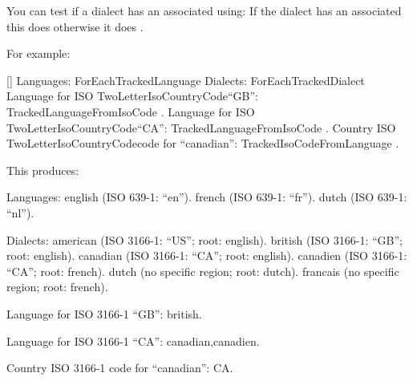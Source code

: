 \documentclass[titlepage=false,oneside,
 fontsize=12pt,captions=tableheading]{scrbook}
\begin{document}
You can test if a dialect has an associated  using:
If the dialect has an associated  this does 
otherwise it does .

For example:
\begin{codebox}
[\dcomma{}\dcomma{}\dcomma{}\dcomma{}\dcomma{}]
\codepar
{}
\codepar
{}
Languages:
\gls{ForEachTrackedLanguage}
\codepar
Dialects:
\gls{ForEachTrackedDialect}
\codepar
Language for ISO \gls{TwoLetterIsoCountryCode}\cmd{ }``GB'':
\gls{TrackedLanguageFromIsoCode}
  .
\codepar
Language for ISO \gls{TwoLetterIsoCountryCode}\cmd{ }``CA'': 
\gls{TrackedLanguageFromIsoCode}
  .
\codepar
Country ISO \gls{TwoLetterIsoCountryCode}\cmd{ }code for ``canadian'':
\gls{TrackedIsoCodeFromLanguage}
  .
\end{codebox}
This produces:
\begin{resultbox}
Languages: english (ISO 639-1: ``en''). french (ISO 639-1: ``fr'').
dutch (ISO 639-1: ``nl'').

Dialects: american (ISO 3166-1: ``US''; root: english).
british (ISO 3166-1: ``GB''; root: english).
canadian (ISO 3166-1: ``CA''; root: english).
canadien (ISO 3166-1: ``CA''; root: french).
dutch (no specific region; root: dutch).
francais (no specific region; root: french).

Language for ISO 3166-1 ``GB'': british.

Language for ISO 3166-1 ``CA'': canadian,canadien.

Country ISO 3166-1 code for ``canadian'': CA.
\end{resultbox}
\end{document}
